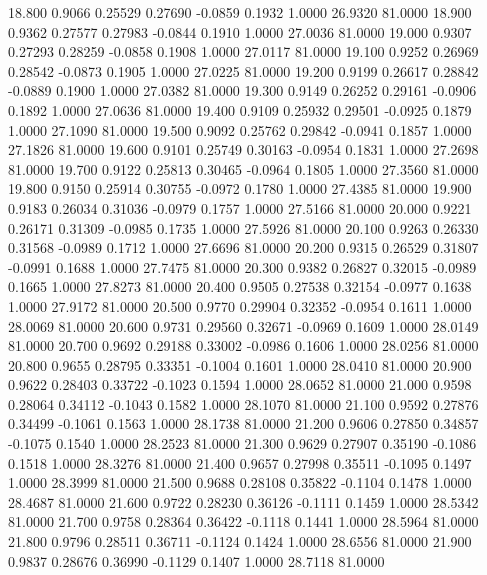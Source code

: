   18.800   0.9066   0.25529   0.27690  -0.0859   0.1932   1.0000  26.9320  81.0000
  18.900   0.9362   0.27577   0.27983  -0.0844   0.1910   1.0000  27.0036  81.0000
  19.000   0.9307   0.27293   0.28259  -0.0858   0.1908   1.0000  27.0117  81.0000
  19.100   0.9252   0.26969   0.28542  -0.0873   0.1905   1.0000  27.0225  81.0000
  19.200   0.9199   0.26617   0.28842  -0.0889   0.1900   1.0000  27.0382  81.0000
  19.300   0.9149   0.26252   0.29161  -0.0906   0.1892   1.0000  27.0636  81.0000
  19.400   0.9109   0.25932   0.29501  -0.0925   0.1879   1.0000  27.1090  81.0000
  19.500   0.9092   0.25762   0.29842  -0.0941   0.1857   1.0000  27.1826  81.0000
  19.600   0.9101   0.25749   0.30163  -0.0954   0.1831   1.0000  27.2698  81.0000
  19.700   0.9122   0.25813   0.30465  -0.0964   0.1805   1.0000  27.3560  81.0000
  19.800   0.9150   0.25914   0.30755  -0.0972   0.1780   1.0000  27.4385  81.0000
  19.900   0.9183   0.26034   0.31036  -0.0979   0.1757   1.0000  27.5166  81.0000
  20.000   0.9221   0.26171   0.31309  -0.0985   0.1735   1.0000  27.5926  81.0000
  20.100   0.9263   0.26330   0.31568  -0.0989   0.1712   1.0000  27.6696  81.0000
  20.200   0.9315   0.26529   0.31807  -0.0991   0.1688   1.0000  27.7475  81.0000
  20.300   0.9382   0.26827   0.32015  -0.0989   0.1665   1.0000  27.8273  81.0000
  20.400   0.9505   0.27538   0.32154  -0.0977   0.1638   1.0000  27.9172  81.0000
  20.500   0.9770   0.29904   0.32352  -0.0954   0.1611   1.0000  28.0069  81.0000
  20.600   0.9731   0.29560   0.32671  -0.0969   0.1609   1.0000  28.0149  81.0000
  20.700   0.9692   0.29188   0.33002  -0.0986   0.1606   1.0000  28.0256  81.0000
  20.800   0.9655   0.28795   0.33351  -0.1004   0.1601   1.0000  28.0410  81.0000
  20.900   0.9622   0.28403   0.33722  -0.1023   0.1594   1.0000  28.0652  81.0000
  21.000   0.9598   0.28064   0.34112  -0.1043   0.1582   1.0000  28.1070  81.0000
  21.100   0.9592   0.27876   0.34499  -0.1061   0.1563   1.0000  28.1738  81.0000
  21.200   0.9606   0.27850   0.34857  -0.1075   0.1540   1.0000  28.2523  81.0000
  21.300   0.9629   0.27907   0.35190  -0.1086   0.1518   1.0000  28.3276  81.0000
  21.400   0.9657   0.27998   0.35511  -0.1095   0.1497   1.0000  28.3999  81.0000
  21.500   0.9688   0.28108   0.35822  -0.1104   0.1478   1.0000  28.4687  81.0000
  21.600   0.9722   0.28230   0.36126  -0.1111   0.1459   1.0000  28.5342  81.0000
  21.700   0.9758   0.28364   0.36422  -0.1118   0.1441   1.0000  28.5964  81.0000
  21.800   0.9796   0.28511   0.36711  -0.1124   0.1424   1.0000  28.6556  81.0000
  21.900   0.9837   0.28676   0.36990  -0.1129   0.1407   1.0000  28.7118  81.0000
